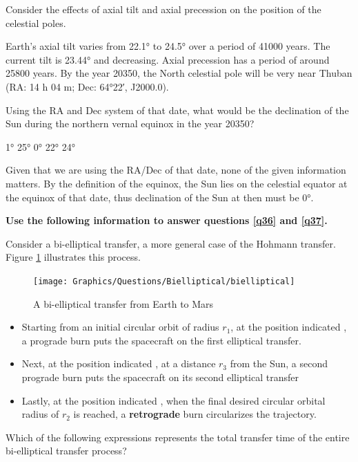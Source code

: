 \documentclass[a4paper,11pt]{exam}
\begin{document}
\begin{questions}
\filbreak
\question
	Consider the effects of axial tilt and axial precession on the position of the celestial poles.

	Earth’s axial tilt varies from \ang{22.1} to \ang{24.5} over a period of \num{41000} years. The current tilt is \ang{23.44} and decreasing. Axial precession has a period of around \num{25800} years. By the year 20350, the North celestial pole will be very near Thuban (RA: 14 h 04 m; Dec: \ang{+64;22;}, J2000.0).

	Using the RA and Dec system of that date, what would be the declination of the Sun during the northern vernal equinox in the year 20350?

	\begin{oneparchoices}
		\choice	\ang{1}
		\choice	\ang{25}
		\correctchoice	\ang{0}
		\choice	\ang{22}
		\choice	\ang{24}
	\end{oneparchoices}
	\begin{solution}
		Given that we are using the RA/Dec of that date, none of the given information matters. By the definition of the equinox, the Sun lies on the celestial equator at the equinox of that date, thus declination of the Sun at then must be \ang{0}.
	\end{solution}

\filbreak
\begin{EnvUplevel}
	\textbf{Use the following information to answer questions \ref{q36} and \ref{q37}.}

	Consider a bi-elliptical transfer, a more general case of the Hohmann transfer. Figure \ref{q36f} illustrates this process.
	\begin{figure}[H]
		\centering
		\texttt{[image: Graphics/Questions/Bielliptical/bielliptical]}
		\renewcommand{\figurename}{Figure}
		\caption{A bi-elliptical transfer from Earth to Mars}
		\label{q36f}
	\end{figure}
	\begin{itemize}[leftmargin=10pt]
		\item Starting from an initial circular orbit of radius $ r_1 $, at the position indicated , a prograde burn puts the spacecraft on the first elliptical transfer.
		\item Next, at the position indicated , at a distance $ r_3 $ from the Sun, a second prograde burn puts the spacecraft on its second elliptical transfer
		\item Lastly, at the position indicated , when the final desired circular orbital radius of $ r_2 $ is reached, a \textbf{retrograde} burn circularizes the trajectory.
	\end{itemize}
	\vspace{-32pt}
\end{EnvUplevel}
\filbreak
\question\label{q36}
	Which of the following expressions represents the total transfer time of the entire bi-elliptical transfer process?


\end{questions}
\end{document}
